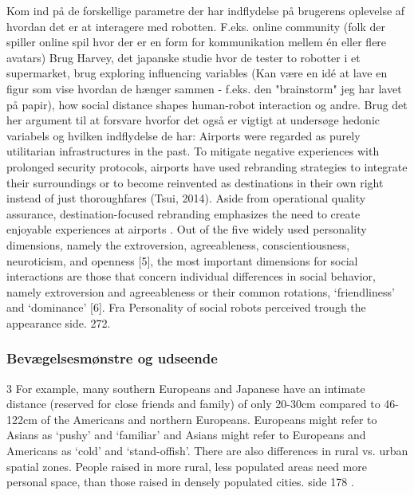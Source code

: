   
  

 
 










Kom ind på de forskellige parametre der har indflydelse på brugerens oplevelse af hvordan det er at interagere med robotten. F.eks. online community (folk der spiller online spil hvor der er en form for kommunikation mellem én eller flere avatars) \blankline
%
Brug Harvey, det japanske studie hvor de tester to robotter i et supermarket, brug exploring influencing variables (Kan være en idé at lave en figur som vise hvordan de hænger sammen - f.eks. den "brainstorm" jeg har lavet på papir), how social distance shapes human-robot interaction og andre. \blankline
%
%
Brug det her argument til at forsvare hvorfor det også er vigtigt at undersøge hedonic variabels og hvilken indflydelse de har: Airports were regarded as purely utilitarian infrastructures in the past. To mitigate negative experiences with prolonged security protocols, airports have used rebranding strategies to integrate their surroundings or to become reinvented as destinations in their own right instead of just thoroughfares (Tsui, 2014). Aside from operational quality assurance, destination-focused rebranding emphasizes the need to create enjoyable experiences at airports \textcite[s. 352]{PDF:TheImpactOfTraveler}.\blankline
%
Out of the five widely used personality dimensions, namely the extroversion, agreeableness, conscientiousness, neuroticism, and openness [5], the most important dimensions for social interactions are those that concern individual differences in social behavior, namely extroversion and agreeableness or their common rotations, ‘friendliness’ and ‘dominance’ [6]. Fra Personality of social robots perceived trough the appearance side. 272.

\subsubsection{Bevægelsesmønstre og udseende}
\label{InteraktionSocialeRobotterParametreBevaegelsesmoenstre}
%


3 For example, many southern Europeans and Japanese have an intimate distance (reserved for close friends and family) of only 20-30cm compared to 46-122cm of the Americans and northern Europeans. Europeans might refer to Asians as ‘pushy’ and ‘familiar’ and Asians might refer to Europeans and Americans as ‘cold’ and ‘stand-offish’. There are also differences in rural vs. urban spatial zones. People raised in more rural, less populated areas need more personal space, than those raised in densely populated cities. side 178 \textcite[s. 178]{PDF:HowMayIServeYou}.


